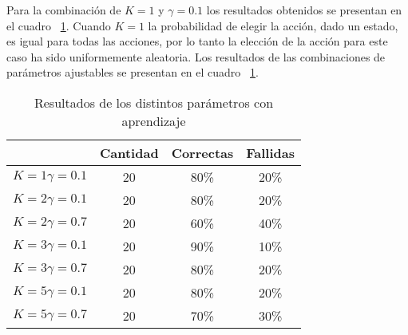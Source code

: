 Para la combinaci\'on de $K = 1$ y $ \gamma = 0.1 $ los resultados obtenidos se presentan en el cuadro ~\ref{tabla:entramientos}. Cuando $K = 1$ la probabilidad de elegir la acci\'on, dado un estado, es igual para todas las acciones, por lo tanto la elección de la acción para este caso ha sido uniformemente aleatoria. Los resultados de las combinaciones de par\'ametros ajustables se presentan en el cuadro ~\ref{tabla:entramientos}.
\begin{table}
\centering
\begin{tabular}{|c|c|c|c|}
\hline 
& Cantidad & Correctas & Fallidas \\ 
\hline 
$K = 1  \gamma = 0.1$ & 20 & 80\% & 20\% \\ 
\hline 
$K = 2  \gamma = 0.1$ & 20 & 80\% & 20\% \\ 
\hline 
$K = 2  \gamma = 0.7$ & 20 & 60\% & 40\% \\ 
\hline 
$K = 3  \gamma = 0.1$ & 20 & 90\% & 10\% \\ 
\hline 
$K = 3  \gamma = 0.7$ & 20 & 80\% & 20\% \\ 
\hline 
$K = 5  \gamma = 0.1$ & 20 & 80\% & 20\% \\ 
\hline  
$K = 5  \gamma = 0.7$ & 20 & 70\% & 30\% \\ 
\hline 

\end{tabular} 

\caption{Resultados de los distintos par\'ametros con aprendizaje}
\label{tabla:entramientos}


\end{table}
%
%
%
